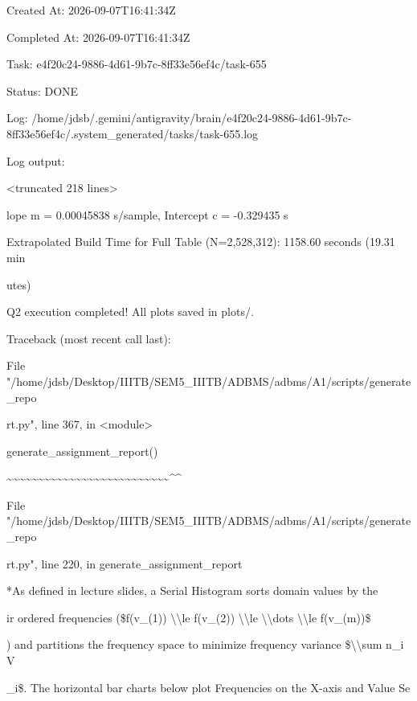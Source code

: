 \documentclass[11pt,a4paper]{article}
\begin{document}
Created At: 2026-09-07T16:41:34Z

Completed At: 2026-09-07T16:41:34Z

Task: e4f20c24-9886-4d61-9b7c-8ff33e56ef4c/task-655

Status: DONE

Log: /home/jdsb/.gemini/antigravity/brain/e4f20c24-9886-4d61-9b7c-8ff33e56ef4c/.system\_generated/tasks/task-655.log

Log output:

<truncated 218 lines>

lope m = 0.00045838 s/sample, Intercept c = -0.329435 s

Extrapolated Build Time for Full Table (N=2,528,312): 1158.60 seconds (19.31 min

utes)

Q2 execution completed! All plots saved in plots/.

Traceback (most recent call last):

File "/home/jdsb/Desktop/IIITB/SEM5\_IIITB/ADBMS/adbms/A1/scripts/generate\_repo

rt.py", line 367, in <module>

generate\_assignment\_report()

\textasciitilde{}\textasciitilde{}\textasciitilde{}\textasciitilde{}\textasciitilde{}\textasciitilde{}\textasciitilde{}\textasciitilde{}\textasciitilde{}\textasciitilde{}\textasciitilde{}\textasciitilde{}\textasciitilde{}\textasciitilde{}\textasciitilde{}\textasciitilde{}\textasciitilde{}\textasciitilde{}\textasciitilde{}\textasciitilde{}\textasciitilde{}\textasciitilde{}\textasciitilde{}\textasciitilde{}\textasciitilde{}\textasciitilde{}\textasciicircum{}\textasciicircum{}

File "/home/jdsb/Desktop/IIITB/SEM5\_IIITB/ADBMS/adbms/A1/scripts/generate\_repo

rt.py", line 220, in generate\_assignment\_report

*As defined in lecture slides, a Serial Histogram sorts domain values by the

ir ordered frequencies (\$f(v\_{(1)}) \textbackslash{}\textbackslash{}le f(v\_{(2)}) \textbackslash{}\textbackslash{}le \textbackslash{}\textbackslash{}dots \textbackslash{}\textbackslash{}le f(v\_{(m)})\$

) and partitions the frequency space to minimize frequency variance \$\textbackslash{}\textbackslash{}sum n\_i V

\_i\$. The horizontal bar charts below plot Frequencies on the X-axis and Value Se
\end{document}
